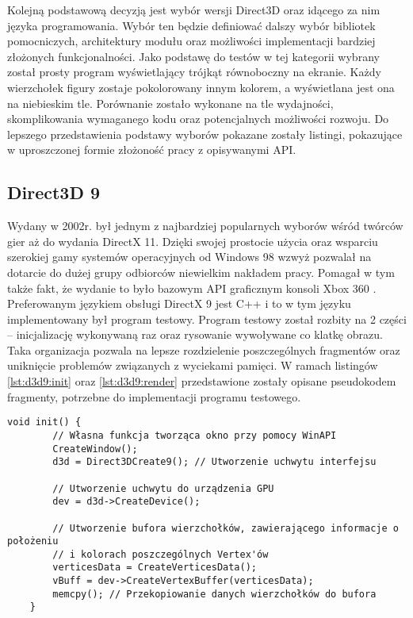 Kolejną podstawową decyzją jest wybór wersji Direct3D oraz idącego za
nim języka programowania. Wybór ten będzie definiować dalszy wybór
bibliotek pomocniczych, architektury modułu oraz możliwości
implementacji bardziej złożonych funkcjonalności. Jako podstawę do testów w tej kategorii wybrany został prosty program
wyświetlający trójkąt równoboczny na ekranie. Każdy wierzchołek figury
zostaje pokolorowany innym kolorem, a wyświetlana jest ona na niebieskim
tle. Porównanie zostało wykonane na tle wydajności, skomplikowania
wymaganego kodu oraz potencjalnych możliwości rozwoju. Do lepszego przedstawienia podstawy wyborów pokazane zostały listingi, pokazujące w uproszczonej formie złożoność pracy z opisywanymi API.

\subsection{Direct3D 9}

Wydany w 2002r. był jednym z najbardziej popularnych wyborów wśród
twórców gier aż do wydania DirectX 11. Dzięki swojej prostocie użycia
oraz wsparciu szerokiej gamy systemów operacyjnych od Windows 98 wzwyż
\cite{falconfly:dxredist:2024} pozwalał na dotarcie do dużej grupy odbiorców niewielkim
nakładem pracy. Pomagał w tym także fakt, że wydanie to było bazowym API
graficznym konsoli Xbox 360 \cite{ms:xbox360bp:2024}. Preferowanym językiem obsługi DirectX 9 jest C++ i to w tym języku
implementowany był program testowy. Program testowy został rozbity na 2 części -- inicjalizację wykonywaną
raz oraz rysowanie wywoływane co klatkę obrazu. Taka organizacja pozwala
na lepsze rozdzielenie poszczególnych fragmentów oraz uniknięcie
problemów związanych z wyciekami pamięci. W ramach listingów \ref{lst:d3d9:init} oraz \ref{lst:d3d9:render} przedstawione zostały opisane pseudokodem fragmenty, potrzebne do implementacji programu testowego.

\begin{lstlisting}[caption={Pseudokod inicjalizacji Direct3D 9 (oryginalna treść)}, label={lst:d3d9:init}]
	void init() {
		// Własna funkcja tworząca okno przy pomocy WinAPI
		CreateWindow();
		d3d = Direct3DCreate9(); // Utworzenie uchwytu interfejsu
		
		// Utworzenie uchwytu do urządzenia GPU
		dev = d3d->CreateDevice();
		
		// Utworzenie bufora wierzchołków, zawierającego informacje o położeniu 
		// i kolorach poszczególnych Vertex'ów
		verticesData = CreateVerticesData();
		vBuff = dev->CreateVertexBuffer(verticesData);
		memcpy(); // Przekopiowanie danych wierzchołków do bufora
	}
\end{lstlisting}

